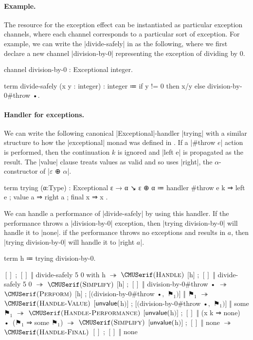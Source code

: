\paragraph{Example.}
%
The resource for the exception effect can be instantiated as particular exception channels, where each channel corresponds to a particular sort of exception.
For example, we can write the \code|divide-safely| in \LangD as the following, where we first declare a new channel \code|division-by-0| representing the exception of dividing by $0$.
%
\begin{snippet}
channel division-by-0 : Exceptional integer.

term divide-safely (x y : integer) : integer
  ≔ if y != 0
      then x/y
      else division-by-0#throw •.
\end{snippet}

\paragraph{Handler for exceptions.}
%
We can write the following canonical \code|Exceptional|-handler \code|trying| with a similar structure to how the \code|exceptional| monad was defined in \LangC.
If a \code|#throw $e$| action is performed, then the continuation $k$ is ignored and \code|left e| is propagated as the result.
The \code|value| clause treats values as valid and so uses \code|right|, the $α$-constructor of \code|$ε$ ⊕ $α$|.
%
\begin{program}[caption={Handler of exceptions as optionals}]
term trying (α:Type) : Exceptional ε → α ↘ ε ⊕ α
  ≔ handler
      { #throw e k ⇒ left e
      ; value  a   ⇒ right a
      ; final  x   ⇒ x }.
\end{program}
%
We can handle a performance of \code|divide-safely| by using this handler.
If the performance throws a \code|division-by-0| exception, then \code|trying division-by-0| will handle it to \code|none|.
if the performance throws no exceptions and results in $a$, then \code|trying division-by-0| will handle it to \code|right $a$|.
%
\begin{snippet}
term h ≔ trying division-by-0.

$[]$ ; $[]$ ‖ divide-safely 5 0 with h
$↠$ $\ruleapp{Handle}$
$[$h$]$ ; $[]$ ‖ divide-safely 5 0
$↠$ $\ruleapp{Simplify}$
$[$h$]$ ; $[]$ ‖ division-by-0#throw •
$↠$ $\ruleapp{Perform}$
$[$h$]$ ; $[($division-by-0#throw •$,$ $⚑_1$$)]$ ‖ $⚑_1$
$↠$ $\ruleapp{Handle-Value}$
$[\mathsf{unvalue}($h$)]$ ; $[($division-by-0#throw •$,$ $⚑_1$$)]$ ‖ some $⚑_1$
$↠$ $\ruleapp{Handle-Performance}$
$[\mathsf{unvalue}($h$)]$ ; $[]$ ‖ (x k ⇒ none) • ($⚑_1$ ⇒ some $⚑_1$)
$↠$ $\ruleapp{Simplify}$
$[\mathsf{unvalue}($h$)]$ ; $[]$ ‖ none
$↠$ $\ruleapp{Handle-Final}$
$[]$ ; $[]$ ‖ none
\end{snippet}

